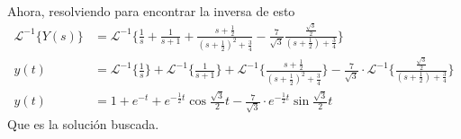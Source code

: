 \documentclass{article}
\begin{document}
\begin{enumerate}
{        	Ahora, resolviendo para encontrar la inversa de esto
        	\begin{align*}
        	\mathcal{L}^{-1}\{Y(s)\} 
        	&= \mathcal{L}^{-1}\{
        	\frac{1}{s} + \frac{1}{s+1}
        	+ \frac{s+\frac{1}{2}}{(s+\frac{1}{2})^2+\frac{3}{4}}
        	- \frac{7}{\sqrt{3}}\frac{\frac{\sqrt{3}}{2}}{(s+\frac{1}{2})+\frac{3}{4}}
        	\} \\
        	y(t) &= \mathcal{L}^{-1}\{\frac{1}{s}\} 
        	+ \mathcal{L}^{-1}\{\frac{1}{s+1}\}
        	+ \mathcal{L}^{-1}\{\frac{s+\frac{1}{2}}{(s+\frac{1}{2})^2+\frac{3}{4}}\} 
        	- \frac{7}{\sqrt{3}} \cdot \mathcal{L}^{-1}\{\frac{\frac{\sqrt{3}}{2}}{(s+\frac{1}{2})+\frac{3}{4}}\}
        	\\
        	y(t) &= 1 + e^{-t} + e^{-\frac{1}{2}t}\cos{\frac{\sqrt{3}}{2}t}
        	- \frac{7}{\sqrt{3}}\cdot e^{-\frac{1}{2}t}\sin{\frac{\sqrt{3}}{2}t}
        	\end{align*}
        	Que es la solución buscada.
        }
    \end{enumerate}
\end{document}
